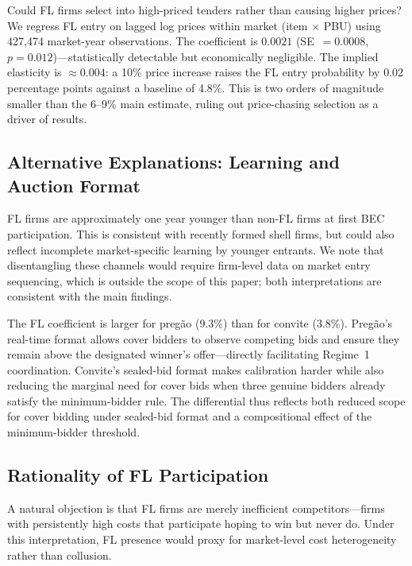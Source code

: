 Could FL firms select into high-priced tenders rather than causing
higher prices? We regress FL entry on lagged log prices within market
(item $\times$ PBU) using 427,474 market-year observations. The
coefficient is $0.0021$ (SE~$=0.0008$, $p = 0.012$)---statistically
detectable but economically negligible. The implied elasticity is
$\approx 0.004$: a 10\% price increase raises the FL entry probability
by 0.02 percentage points against a baseline of 4.8\%. This is two
orders of magnitude smaller than the 6--9\% main estimate, ruling out
price-chasing selection as a driver of results.

\subsection{Alternative Explanations: Learning and Auction Format}

FL firms are approximately one year younger than non-FL firms at first %
BEC participation. This is consistent with recently formed shell firms,
but could also reflect incomplete market-specific learning by younger
entrants. We note that disentangling these channels would require
firm-level data on market entry sequencing, which is outside the scope
of this paper; both interpretations are consistent with the main
findings.

The FL coefficient is larger for preg\~ao (9.3\%) than for convite
(3.8\%). Preg\~ao's real-time format allows cover bidders to observe
competing bids and ensure they remain above the designated winner's
offer---directly facilitating Regime~1 coordination. Convite's
sealed-bid format makes calibration harder while also reducing the
marginal need for cover bids when three genuine bidders already satisfy
the minimum-bidder rule. The differential thus reflects both reduced
scope for cover bidding under sealed-bid format and a compositional
effect of the minimum-bidder threshold.

\subsection{Rationality of FL Participation}
\label{sec:rationality}

A natural objection is that FL firms are merely inefficient
competitors---firms with persistently high costs that participate
hoping to win but never do. Under this interpretation, FL presence
would proxy for market-level cost heterogeneity rather than
collusion.

